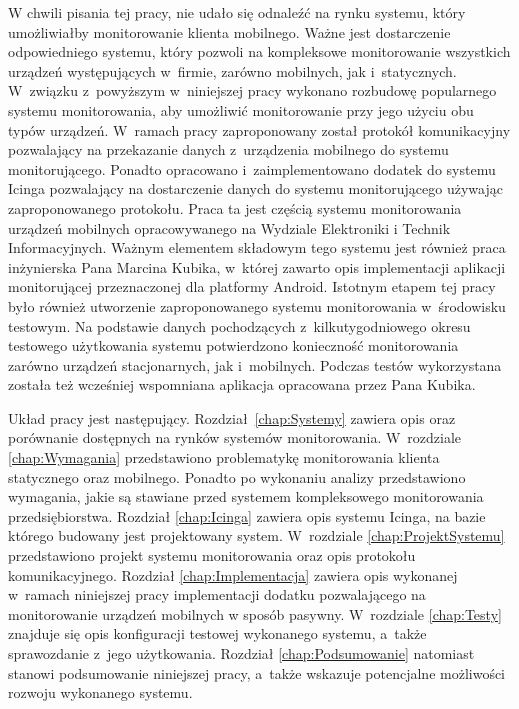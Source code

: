 W chwili pisania tej pracy, nie udało się odnaleźć na rynku systemu,
który umożliwiałby monitorowanie klienta mobilnego. Ważne jest
dostarczenie odpowiedniego systemu, który pozwoli na kompleksowe
monitorowanie wszystkich urządzeń występujących w~firmie, zarówno
mobilnych, jak i~statycznych. W~związku z~powyższym w~niniejszej pracy
wykonano rozbudowę popularnego systemu monitorowania, aby umożliwić
monitorowanie przy jego użyciu obu typów urządzeń. W~ramach pracy
zaproponowany został protokół komunikacyjny pozwalający na przekazanie
danych z~urządzenia mobilnego do systemu monitorującego. Ponadto
opracowano i~zaimplementowano dodatek do systemu Icinga pozwalający na
dostarczenie danych do systemu monitorującego używając zaproponowanego
protokołu. Praca ta jest częścią systemu monitorowania urządzeń
mobilnych opracowywanego na Wydziale Elektroniki i Technik
Informacyjnych. Ważnym elementem składowym tego systemu jest również
praca inżynierska Pana Marcina Kubika\cite{book:pracaKubika}, w~której
zawarto opis implementacji aplikacji monitorującej przeznaczonej dla
platformy Android. Istotnym etapem tej pracy było również utworzenie
zaproponowanego systemu monitorowania w~środowisku testowym. Na
podstawie danych pochodzących z~kilkutygodniowego okresu testowego
użytkowania systemu potwierdzono konieczność monitorowania zarówno
urządzeń stacjonarnych, jak i~mobilnych. Podczas testów wykorzystana
została też wcześniej wspomniana aplikacja opracowana przez Pana Kubika.

Układ pracy jest następujący. Rozdział~\ref{chap:Systemy} zawiera opis
oraz porównanie dostępnych na rynków systemów
monitorowania. W~rozdziale \ref{chap:Wymagania} przedstawiono
problematykę monitorowania klienta statycznego oraz mobilnego. Ponadto
po wykonaniu analizy przedstawiono wymagania, jakie są stawiane przed
systemem kompleksowego monitorowania przedsiębiorstwa. Rozdział
\ref{chap:Icinga} zawiera opis systemu Icinga, na bazie którego
budowany jest projektowany system. W~rozdziale
\ref{chap:ProjektSystemu} przedstawiono projekt systemu monitorowania
oraz opis protokołu komunikacyjnego. Rozdział \ref{chap:Implementacja}
zawiera opis wykonanej w~ramach niniejszej pracy implementacji dodatku
pozwalającego na monitorowanie urządzeń mobilnych w sposób
pasywny. W~rozdziale \ref{chap:Testy} znajduje się opis konfiguracji
testowej wykonanego systemu, a~także sprawozdanie z~jego
użytkowania. Rozdział \ref{chap:Podsumowanie} natomiast stanowi
podsumowanie niniejszej pracy, a~także wskazuje potencjalne możliwości
rozwoju wykonanego systemu.
